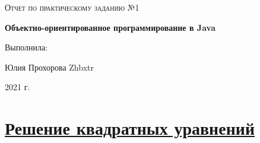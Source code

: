 \documentclass[a4paper]{article}
\begin{document}
\begin{titlepage}
	\centering
    
	\vspace{10cm}
	{\scshape\LARGE  Отчет по практическому заданию №1 \par}
	\vspace{1cm}
	{\huge\bfseries  Объектно-ориентированное программирование в Java\par}
	\vspace{1cm}
	\vfill
\begin{flushright}
	{\large Выполнила:}\par
	\vspace{0.3cm}
    {\LARGE Юлия Прохорова}
Zhbxtr
\end{flushright}
	
	\vfill

	2021 г.
\end{titlepage}

\newpage

\pagestyle{fancy} 
\fancyhead[C]{}
\fancyfoot{}
\fancyfoot[C]{ \noindent\rule{\textwidth}{0.4pt} \thepage }

\tableofcontents

\newpage

\newcommand{\RNumb}[1]{\uppercase\expandafter{\romannumeral #1\relax}}


\section{\href{https://github.com/julproh/5_sem/tree/main/NetCracker/Java_Basics_and_OOP/first_task/equations}{Решение квадратных уравнений}}
\end{document}
